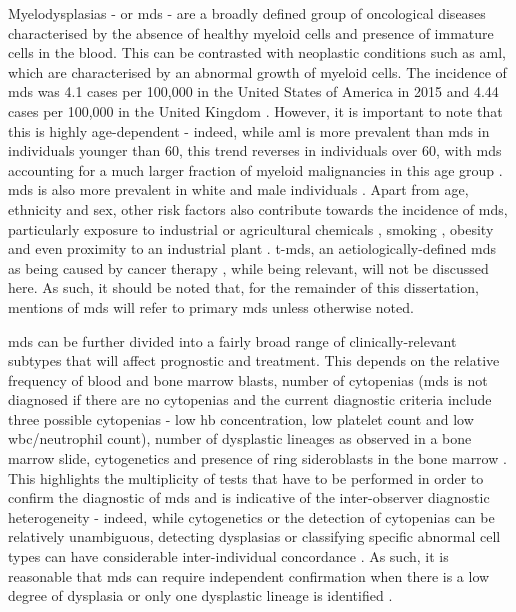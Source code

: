 Myelodysplasias - or \ac{mds} - are a broadly defined group of oncological diseases characterised by the absence of healthy myeloid cells and presence of immature cells in the blood. This can be contrasted with neoplastic conditions such as \ac{aml}, which are characterised by an abnormal growth of myeloid cells. The incidence of \ac{mds} was 4.1 cases per 100,000 in the United States of America in 2015 \cite{Zeidan2019-jj} and 4.44 cases per 100,000 in the United Kingdom \cite{Roman2016-ad}. However, it is important to note that this is highly age-dependent - indeed, while \ac{aml} is more prevalent than \ac{mds} in individuals younger than 60, this trend reverses in individuals over 60, with \ac{mds} accounting for a much larger fraction of myeloid malignancies in this age group \cite{Zeidan2019-jj}. \ac{mds} is also more prevalent in white and male individuals \cite{Zeidan2019-jj}. Apart from age, ethnicity and sex, other risk factors also contribute towards the incidence of \ac{mds}, particularly exposure to industrial or agricultural chemicals \cite{Nisse2001-qf,Lv2011-iv,Strom2005-pq}, smoking \cite{Lv2011-iv,Strom2005-pq}, obesity \cite{Ma2009-ws} and even proximity to an industrial plant \cite{Nisse2001-qf}. \Ac{t-mds}, an aetiologically-defined \ac{mds} as being caused by cancer therapy \cite{Kuendgen2021-in}, while being relevant, will not be discussed here. As such, it should be noted that, for the remainder of this dissertation, mentions of \ac{mds} will refer to primary \ac{mds} unless otherwise noted.

\ac{mds} can be further divided into a fairly broad range of clinically-relevant subtypes that will affect prognostic and treatment. This depends on the relative frequency of blood and bone marrow blasts, number of cytopenias (\ac{mds} is not diagnosed if there are no cytopenias and the current diagnostic criteria include three possible cytopenias - low \ac{hb} concentration, low platelet count and low \ac{wbc}/neutrophil count), number of dysplastic lineages as observed in a bone marrow slide, cytogenetics and presence of ring sideroblasts in the bone marrow \cite{Arber2016-os}. This highlights the multiplicity of tests that have to be performed in order to confirm the diagnostic of \ac{mds} and is indicative of the inter-observer diagnostic heterogeneity - indeed, while cytogenetics or the detection of cytopenias can be relatively unambiguous, detecting dysplasias or classifying specific abnormal cell types can have considerable inter-individual concordance \cite{Font2013-lx, Parmentier2012-wm, Della_Porta2015-hw}. As such, it is reasonable that \ac{mds} can require independent confirmation when there is a low degree of dysplasia or only one dysplastic lineage is identified \cite{Arber2016-os}.

